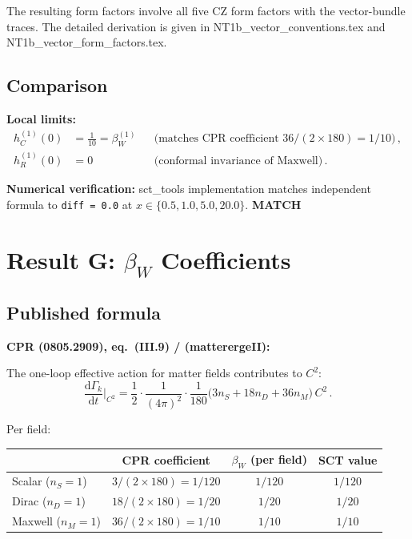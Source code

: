 \documentclass[12pt,a4paper]{article}
\theoremstyle{definition}
\theoremstyle{remark}
\newcommand{\dd}{\mathrm{d}}
\newcommand{\match}{\textcolor{green!60!black}{\textbf{MATCH}}}
\begin{document}
The resulting form factors involve all five CZ form factors with the
vector-bundle traces.  The detailed derivation is given in
NT1b\_vector\_conventions.tex and NT1b\_vector\_form\_factors.tex.

\subsection{Comparison}

\textbf{Local limits:}
\begin{align*}
  h_C^{(1)}(0) &= \frac{1}{10} = \beta_W^{(1)}
  &&\text{(matches CPR coefficient $36/(2 \times 180) = 1/10$)}\,,\\
  h_R^{(1)}(0) &= 0
  &&\text{(conformal invariance of Maxwell)}\,.
\end{align*}

\textbf{Numerical verification:}
sct\_tools implementation matches independent formula to \texttt{diff = 0.0}
at $x \in \{0.5, 1.0, 5.0, 20.0\}$. \match


\section{Result G: $\beta_W$ Coefficients}
\label{sec:beta}

\subsection{Published formula}

\noindent\textbf{CPR (0805.2909), eq.~(III.9) / (matterergeII):}

The one-loop effective action for matter fields contributes to $C^2$:
\begin{equation}
  \frac{\dd\Gamma_k}{\dd t}\bigg|_{C^2}
  = \frac{1}{2}\cdot\frac{1}{(4\pi)^2}\cdot\frac{1}{180}
    \bigl(3n_S + 18n_D + 36n_M\bigr)\,C^2\,.
\end{equation}

\noindent Per field:
\begin{center}
\renewcommand{\arraystretch}{1.3}
\begin{tabular}{lccc}
\toprule
& \textbf{CPR coefficient} & \textbf{$\beta_W$ (per field)} & \textbf{SCT value} \\
\midrule
Scalar ($n_S = 1$) & $3/(2 \times 180) = 1/120$ & $1/120$ & $1/120$ \\
Dirac ($n_D = 1$) & $18/(2 \times 180) = 1/20$ & $1/20$ & $1/20$ \\
Maxwell ($n_M = 1$) & $36/(2 \times 180) = 1/10$ & $1/10$ & $1/10$ \\
\bottomrule
\end{tabular}
\end{center}
\end{document}
